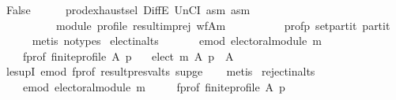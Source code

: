 \begin{isabellebody}
\ {\isachardoublequoteopen}False{\isachardoublequoteclose}\isanewline
\ \ \ \ \isamarkupfalse%
\ prod{\isachardot}{\kern0pt}exhaust{\isacharunderscore}{\kern0pt}sel\ DiffE\ UnCI\ asm{}\ asm{}\isanewline
\ \ \ \ \ \ \ \ \ \ module\ profile\ result{\isacharunderscore}{\kern0pt}imp{\isacharunderscore}{\kern0pt}rej\ wf{\isacharunderscore}{\kern0pt}A{\isacharunderscore}{\kern0pt}m\isanewline
\ \ \ \ \ \ \ \ \ \ prof{\isacharunderscore}{\kern0pt}p\ set{\isacharunderscore}{\kern0pt}partit\ partit\isanewline
\ \ \ \ \isamarkupfalse%
\ {\isacharparenleft}{\kern0pt}metis\ {\isacharparenleft}{\kern0pt}no{\isacharunderscore}{\kern0pt}types{\isacharparenright}{\kern0pt}{\isacharparenright}{\kern0pt}\isanewline
{}\isamarkupfalse%
%
\endisatagproof
{\isafoldproof}%
%
\isadelimproof
\isanewline
%
\endisadelimproof
\isanewline
{}\isamarkupfalse%
\ elect{\isacharunderscore}{\kern0pt}in{\isacharunderscore}{\kern0pt}alts{\isacharcolon}{\kern0pt}\isanewline
\ \ \isanewline
\ \ \ \ e{\isacharunderscore}{\kern0pt}mod{\isacharcolon}{\kern0pt}\ {\isachardoublequoteopen}electoral{\isacharunderscore}{\kern0pt}module\ m{\isachardoublequoteclose}\ \isanewline
\ \ \ \ f{\isacharunderscore}{\kern0pt}prof{\isacharcolon}{\kern0pt}\ {\isachardoublequoteopen}finite{\isacharunderscore}{\kern0pt}profile\ A\ p{\isachardoublequoteclose}\isanewline
\ \ \ {\isachardoublequoteopen}elect\ m\ A\ p\ {\isasymsubseteq}\ A{\isachardoublequoteclose}\isanewline
%
\isadelimproof
\ \ %
\endisadelimproof
%
\isatagproof
{}\isamarkupfalse%
\ le{\isacharunderscore}{\kern0pt}supI{}\ e{\isacharunderscore}{\kern0pt}mod\ f{\isacharunderscore}{\kern0pt}prof\ result{\isacharunderscore}{\kern0pt}presv{\isacharunderscore}{\kern0pt}alts\ sup{\isacharunderscore}{\kern0pt}ge{}\isanewline
\ \ \isamarkupfalse%
\ metis%
\endisatagproof
{\isafoldproof}%
%
\isadelimproof
\isanewline
%
\endisadelimproof
\isanewline
{}\isamarkupfalse%
\ reject{\isacharunderscore}{\kern0pt}in{\isacharunderscore}{\kern0pt}alts{\isacharcolon}{\kern0pt}\isanewline
\ \ \isanewline
\ \ \ \ e{\isacharunderscore}{\kern0pt}mod{\isacharcolon}{\kern0pt}\ {\isachardoublequoteopen}electoral{\isacharunderscore}{\kern0pt}module\ m{\isachardoublequoteclose}\ \isanewline
\ \ \ \ f{\isacharunderscore}{\kern0pt}prof{\isacharcolon}{\kern0pt}\ {\isachardoublequoteopen}finite{\isacharunderscore}{\kern0pt}profile\ A\ p{\isachardoublequoteclose}\isanewline

\end{isabellebody}
